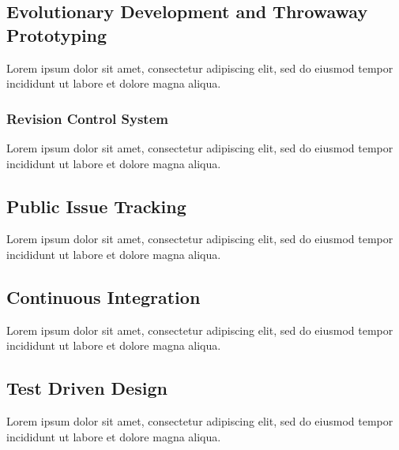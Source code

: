 \documentclass[12pt, a4paper]{article}
\begin{document}

\subsection{Evolutionary Development and Throwaway Prototyping}

Lorem ipsum dolor sit amet, consectetur adipiscing elit, sed do eiusmod tempor incididunt ut labore et dolore magna aliqua.


\subsubsection{Revision Control System}

Lorem ipsum dolor sit amet, consectetur adipiscing elit, sed do eiusmod tempor incididunt ut labore et dolore magna aliqua.


\subsection{Public Issue Tracking}

Lorem ipsum dolor sit amet, consectetur adipiscing elit, sed do eiusmod tempor incididunt ut labore et dolore magna aliqua.


\subsection{Continuous Integration}

Lorem ipsum dolor sit amet, consectetur adipiscing elit, sed do eiusmod tempor incididunt ut labore et dolore magna aliqua.


\subsection{Test Driven Design}

Lorem ipsum dolor sit amet, consectetur adipiscing elit, sed do eiusmod tempor incididunt ut labore et dolore magna aliqua.
\end{document}
